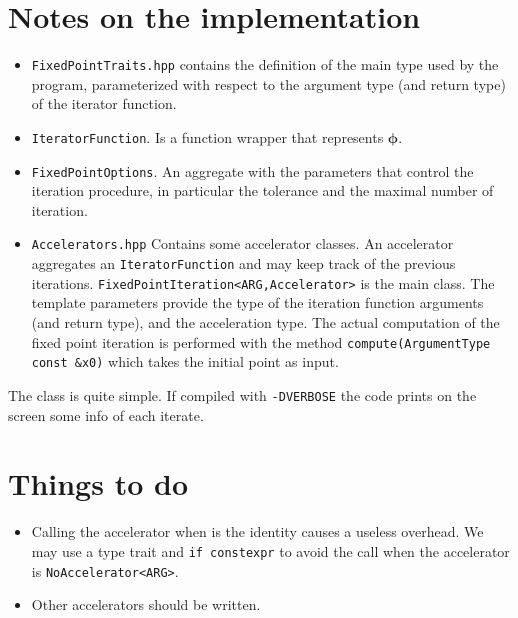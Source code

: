 \documentclass{article}
\begin{document}
\section{Notes on the implementation}
\begin{itemize}
    \item \texttt{FixedPointTraits.hpp} contains the definition of the main type used by the program, parameterized with respect to the argument type (and return type) of the iterator function.
    \item \texttt{IteratorFunction}. Is a function wrapper that represents $\boldsymbol{\phi}$.
    \item \texttt{FixedPointOptions}. An aggregate with the parameters that control the iteration procedure, in particular the tolerance and the maximal number of iteration.
    \item \texttt{Accelerators.hpp} Contains some accelerator classes. An accelerator aggregates an
    \texttt{IteratorFunction} and may keep track of the previous iterations.
    \texttt{FixedPointIteration<ARG,Accelerator>} is the main class. The template parameters provide the type of the iteration function arguments (and return type), and the acceleration type. The actual computation of the fixed point iteration is performed with the method \texttt{compute(ArgumentType const \&x0)} which takes the initial point as input.
\end{itemize}
 
The class is quite simple. If compiled  with \texttt{-DVERBOSE} the code prints on the screen some info of each iterate.

\section{Things to do}
\begin{itemize}
    \item Calling the accelerator when is the identity causes a useless overhead.
    We may use a type trait and \texttt{if constexpr} to avoid the call when the accelerator is \texttt{NoAccelerator<ARG>}.
    \item Other accelerators should be written.
\end{itemize}
\end{document}
